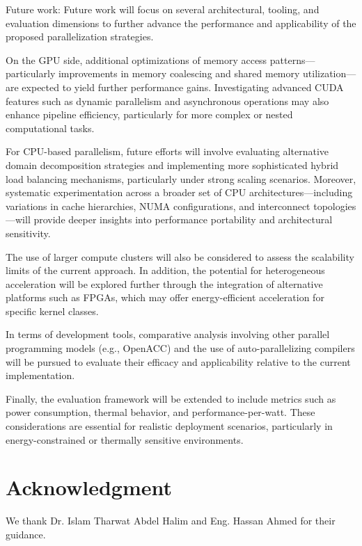 \documentclass[conference, 10pt]{IEEEtran}
\begin{document}
Future work:
Future work will focus on several architectural, tooling, and evaluation dimensions to further advance the performance and applicability of the proposed parallelization strategies.

On the GPU side, additional optimizations of memory access patterns—particularly improvements in memory coalescing and shared memory utilization—are expected to yield further performance gains. Investigating advanced CUDA features such as dynamic parallelism and asynchronous operations may also enhance pipeline efficiency, particularly for more complex or nested computational tasks.

For CPU-based parallelism, future efforts will involve evaluating alternative domain decomposition strategies and implementing more sophisticated hybrid load balancing mechanisms, particularly under strong scaling scenarios. Moreover, systematic experimentation across a broader set of CPU architectures—including variations in cache hierarchies, NUMA configurations, and interconnect topologies—will provide deeper insights into performance portability and architectural sensitivity.

The use of larger compute clusters will also be considered to assess the scalability limits of the current approach. In addition, the potential for heterogeneous acceleration will be explored further through the integration of alternative platforms such as FPGAs, which may offer energy-efficient acceleration for specific kernel classes.

In terms of development tools, comparative analysis involving other parallel programming models (e.g., OpenACC) and the use of auto-parallelizing compilers will be pursued to evaluate their efficacy and applicability relative to the current implementation.

Finally, the evaluation framework will be extended to include metrics such as power consumption, thermal behavior, and performance-per-watt. These considerations are essential for realistic deployment scenarios, particularly in energy-constrained or thermally sensitive environments.






\section*{Acknowledgment} 
We thank Dr. Islam Tharwat Abdel Halim and Eng. Hassan Ahmed for their guidance.


 
\end{document}
